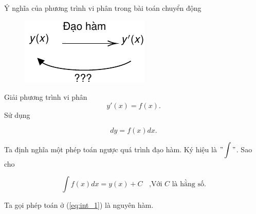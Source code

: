 \begin{frame}{Ý nghĩa của phương trình vi phân trong bài toán chuyển động}



    \begin{center}
    \begin{minipage}{0.45\linewidth}
    \begin{figure}
        \centering
        \includegraphics[width=0.6\linewidth]{Figures/Int_1.pdf}
        \label{fig:Int_1}
    \end{figure}
    \end{minipage}
    \hspace{1mm}
    \begin{minipage}{0.4\linewidth}
        Giải phương trình vi phân
        \begin{equation*}
            y'(x) = f(x).
        \end{equation*}
    Sử dụng 
    \vspace{-2mm}
    
    \begin{equation*}
        dy = f(x) dx.
    \end{equation*}
    \end{minipage}
    \end{center}
    Ta định nghĩa một phép toán ngược quá trình đạo hàm. Ký hiệu là \("\displaystyle \int "\). Sao cho
    \vspace{1mm}
    
    \begin{equation}
        \int f(x) dx = y(x) + C \ \ \ \ \text{,Với \(C\) là hằng số}.
        \label{eq:int_1}
    \end{equation}
    
    Ta gọi phép toán ở (\ref{eq:int_1}) là nguyên hàm.
\end{frame}


